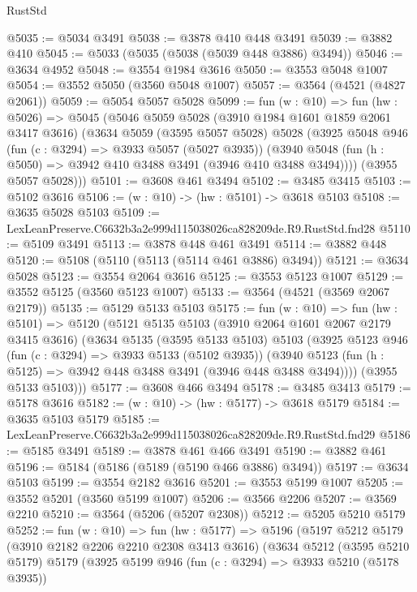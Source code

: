 \begin{lexlean}{RustStd}
\begin{coremodule}
@5035 := @5034 @3491
@5038 := @3878 @410 @448 @3491
@5039 := @3882 @410
@5045 := @5033 (@5035 (@5038 (@5039 @448 @3886) @3494))
@5046 := @3634 @4952
@5048 := @3554 @1984 @3616
@5050 := @3553 @5048 @1007
@5054 := @3552 @5050 (@3560 @5048 @1007)
@5057 := @3564 (@4521 (@4827 @2061))
@5059 := @5054 @5057 @5028
@5099 := fun (w : @10) =>
  fun (hw : @5026) =>
  @5045
    (@5046
      @5059
      @5028
      (@3910 @1984 @1601 @1859 @2061 @3417 @3616)
      (@3634
        @5059
        (@3595 @5057 @5028)
        @5028
        (@3925
          @5048
          @946
          (fun (c : @3294) => @3933 @5057 (@5027 @3935))
          (@3940 @5048 (fun (h : @5050) => @3942 @410 @3488 @3491 (@3946 @410 @3488 @3494))))
        (@3955 @5057 @5028)))
@5101 := @3608 @461 @3494
@5102 := @3485 @3415
@5103 := @5102 @3616
@5106 := (w : @10) -> (hw : @5101) -> @3618 @5103
@5108 := @3635 @5028 @5103
@5109 := LexLeanPreserve.C6632b3a2e999d115038026ca828209de.R9.RustStd.fnd28
@5110 := @5109 @3491
@5113 := @3878 @448 @461 @3491
@5114 := @3882 @448
@5120 := @5108 (@5110 (@5113 (@5114 @461 @3886) @3494))
@5121 := @3634 @5028
@5123 := @3554 @2064 @3616
@5125 := @3553 @5123 @1007
@5129 := @3552 @5125 (@3560 @5123 @1007)
@5133 := @3564 (@4521 (@3569 @2067 @2179))
@5135 := @5129 @5133 @5103
@5175 := fun (w : @10) =>
  fun (hw : @5101) =>
  @5120
    (@5121
      @5135
      @5103
      (@3910 @2064 @1601 @2067 @2179 @3415 @3616)
      (@3634
        @5135
        (@3595 @5133 @5103)
        @5103
        (@3925
          @5123
          @946
          (fun (c : @3294) => @3933 @5133 (@5102 @3935))
          (@3940 @5123 (fun (h : @5125) => @3942 @448 @3488 @3491 (@3946 @448 @3488 @3494))))
        (@3955 @5133 @5103)))
@5177 := @3608 @466 @3494
@5178 := @3485 @3413
@5179 := @5178 @3616
@5182 := (w : @10) -> (hw : @5177) -> @3618 @5179
@5184 := @3635 @5103 @5179
@5185 := LexLeanPreserve.C6632b3a2e999d115038026ca828209de.R9.RustStd.fnd29
@5186 := @5185 @3491
@5189 := @3878 @461 @466 @3491
@5190 := @3882 @461
@5196 := @5184 (@5186 (@5189 (@5190 @466 @3886) @3494))
@5197 := @3634 @5103
@5199 := @3554 @2182 @3616
@5201 := @3553 @5199 @1007
@5205 := @3552 @5201 (@3560 @5199 @1007)
@5206 := @3566 @2206
@5207 := @3569 @2210
@5210 := @3564 (@5206 (@5207 @2308))
@5212 := @5205 @5210 @5179
@5252 := fun (w : @10) =>
  fun (hw : @5177) =>
  @5196
    (@5197
      @5212
      @5179
      (@3910 @2182 @2206 @2210 @2308 @3413 @3616)
      (@3634
        @5212
        (@3595 @5210 @5179)
        @5179
        (@3925
          @5199
          @946
          (fun (c : @3294) => @3933 @5210 (@5178 @3935))

\end{coremodule}
\end{lexlean}
